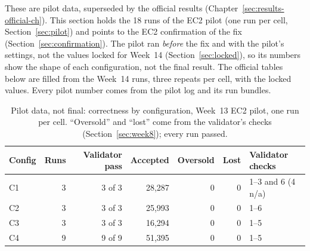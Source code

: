 \documentclass[a4paper]{report}
\begin{document}
These are pilot data, superseded by the official results
(Chapter~\ref{sec:results-official-ch}). This section holds the 18 runs of the EC2 pilot (one run per cell, Section~\ref{sec:pilot}) and points to the
EC2 confirmation of the fix (Section~\ref{sec:confirmation}). The pilot ran
\emph{before} the fix and with the pilot's settings, not the values locked for
Week~14 (Section~\ref{sec:locked}), so its numbers show the shape of each
configuration, not the final result. The official tables below are filled from
the Week~14 runs, three repeats per cell, with the locked values. Every pilot
number comes from the pilot log and its run bundles.

\begin{table}[tbp]
\centering
\small
\caption{Pilot data, not final: correctness by configuration, Week~13 EC2
pilot, one run per cell. ``Oversold'' and ``lost'' come from the validator's
checks (Section~\ref{sec:week8}); every run passed.}
\label{tab:pilot-correctness}
\begin{tabular}{@{}lrrrrrl@{}}
\toprule
Config & Runs & Validator pass & Accepted & Oversold & Lost & Validator checks \\
\midrule
C1 & 3 & 3 of 3 & 28,287 & 0 & 0 & 1--3 and 6 (4 n/a) \\
C2 & 3 & 3 of 3 & 25,993 & 0 & 0 & 1--6 \\
C3 & 3 & 3 of 3 & 16,294 & 0 & 0 & 1--5 \\
C4 & 9 & 9 of 9 & 51,395 & 0 & 0 & 1--5 \\
\bottomrule
\end{tabular}
\end{table}
\end{document}
